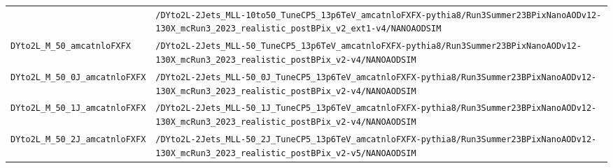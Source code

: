 \begin{longtable}{@{}>{\RaggedRight\arraybackslash}p{} >{\RaggedRight\arraybackslash}p{}@{}}
 & \texttt{/\allowbreak{}DYto2L-\allowbreak{}2Jets\_\allowbreak{}MLL-\allowbreak{}10to50\_\allowbreak{}TuneCP5\_\allowbreak{}13p6TeV\_\allowbreak{}amcatnloFXFX-\allowbreak{}pythia8/\allowbreak{}Run3Summer23BPixNanoAODv12-\allowbreak{}130X\_\allowbreak{}mcRun3\_\allowbreak{}2023\_\allowbreak{}realistic\_\allowbreak{}postBPix\_\allowbreak{}v2\_\allowbreak{}ext1-\allowbreak{}v4/\allowbreak{}NANOAODSIM} \\
\addlinespace[2pt]
\texttt{DYto2L\_\allowbreak{}M\_\allowbreak{}50\_\allowbreak{}amcatnloFXFX} & \texttt{/\allowbreak{}DYto2L-\allowbreak{}2Jets\_\allowbreak{}MLL-\allowbreak{}50\_\allowbreak{}TuneCP5\_\allowbreak{}13p6TeV\_\allowbreak{}amcatnloFXFX-\allowbreak{}pythia8/\allowbreak{}Run3Summer23BPixNanoAODv12-\allowbreak{}130X\_\allowbreak{}mcRun3\_\allowbreak{}2023\_\allowbreak{}realistic\_\allowbreak{}postBPix\_\allowbreak{}v2-\allowbreak{}v4/\allowbreak{}NANOAODSIM} \\
\addlinespace[2pt]
\texttt{DYto2L\_\allowbreak{}M\_\allowbreak{}50\_\allowbreak{}0J\_\allowbreak{}amcatnloFXFX} & \texttt{/\allowbreak{}DYto2L-\allowbreak{}2Jets\_\allowbreak{}MLL-\allowbreak{}50\_\allowbreak{}0J\_\allowbreak{}TuneCP5\_\allowbreak{}13p6TeV\_\allowbreak{}amcatnloFXFX-\allowbreak{}pythia8/\allowbreak{}Run3Summer23BPixNanoAODv12-\allowbreak{}130X\_\allowbreak{}mcRun3\_\allowbreak{}2023\_\allowbreak{}realistic\_\allowbreak{}postBPix\_\allowbreak{}v2-\allowbreak{}v4/\allowbreak{}NANOAODSIM} \\
\addlinespace[2pt]
\texttt{DYto2L\_\allowbreak{}M\_\allowbreak{}50\_\allowbreak{}1J\_\allowbreak{}amcatnloFXFX} & \texttt{/\allowbreak{}DYto2L-\allowbreak{}2Jets\_\allowbreak{}MLL-\allowbreak{}50\_\allowbreak{}1J\_\allowbreak{}TuneCP5\_\allowbreak{}13p6TeV\_\allowbreak{}amcatnloFXFX-\allowbreak{}pythia8/\allowbreak{}Run3Summer23BPixNanoAODv12-\allowbreak{}130X\_\allowbreak{}mcRun3\_\allowbreak{}2023\_\allowbreak{}realistic\_\allowbreak{}postBPix\_\allowbreak{}v2-\allowbreak{}v4/\allowbreak{}NANOAODSIM} \\
\addlinespace[2pt]
\texttt{DYto2L\_\allowbreak{}M\_\allowbreak{}50\_\allowbreak{}2J\_\allowbreak{}amcatnloFXFX} & \texttt{/\allowbreak{}DYto2L-\allowbreak{}2Jets\_\allowbreak{}MLL-\allowbreak{}50\_\allowbreak{}2J\_\allowbreak{}TuneCP5\_\allowbreak{}13p6TeV\_\allowbreak{}amcatnloFXFX-\allowbreak{}pythia8/\allowbreak{}Run3Summer23BPixNanoAODv12-\allowbreak{}130X\_\allowbreak{}mcRun3\_\allowbreak{}2023\_\allowbreak{}realistic\_\allowbreak{}postBPix\_\allowbreak{}v2-\allowbreak{}v5/\allowbreak{}NANOAODSIM} \\

\end{longtable}
